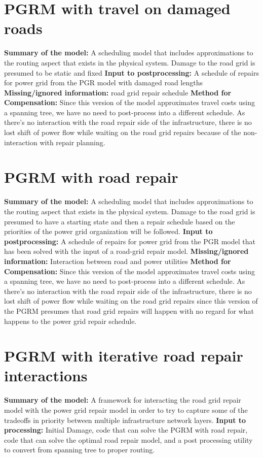 \documentclass{article}
\begin{document}
\section{PGRM with travel on damaged roads}
\textbf{Summary of the model:} A scheduling model that includes approximations to the routing aspect that exists in the physical system. Damage to the road grid is presumed to be static and fixed
\textbf{Input to postprocessing:} A schedule of repairs for power grid from the PGR model with damaged road lengths\newline
\textbf{Missing/ignored information:} road grid repair schedule\newline
\textbf{Method for Compensation:}
Since this version of the model approximates travel costs using a spanning tree, we have no need to post-process into a different schedule. As there's no interaction with the road repair side of the infrastructure, there is no lost shift of power flow while waiting on the road grid repairs because of the non-interaction with repair planning.

\section{PGRM with road repair}
\textbf{Summary of the model:} A scheduling model that includes approximations to the routing aspect that exists in the physical system. Damage to the road grid is presumed to have a starting state and then a repair schedule based on the priorities of the power grid organization will be followed.
\textbf{Input to postprocessing:} A schedule of repairs for power grid from the PGR model that has been solved with the input of a road-grid repair model.\newline
\textbf{Missing/ignored information:} Interaction between road and power utilities \newline
\textbf{Method for Compensation:}
Since this version of the model approximates travel costs using a spanning tree, we have no need to post-process into a different schedule. As there's no interaction with the road repair side of the infrastructure, there is no lost shift of power flow while waiting on the road grid repairs since this version of the PGRM presumes that road grid repairs will happen with no regard for what happens to the power grid repair schedule.

\section{PGRM with iterative road repair interactions}
\textbf{Summary of the model:} A framework for interacting the road grid repair model with the power grid repair model in order to try to capture some of the tradeoffs in priority between multiple infrastructure network layers.
\textbf{Input to processing:} Initial Damage, code that can solve the PGRM with road repair, code that can solve the optimal road repair model, and a post processing utility to convert from spanning tree to proper routing. \newline
\end{document}
